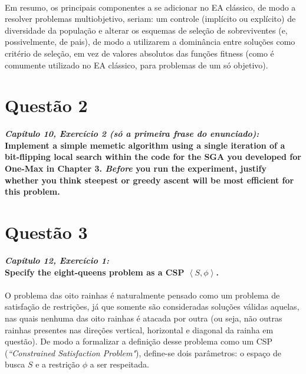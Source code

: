 \documentclass{report}
\begin{document}
\paragraph{} Em resumo, os principais componentes a se adicionar no EA clássico, de modo a resolver problemas multiobjetivo, seriam: um controle (implícito ou explícito) de diversidade da população e alterar os esquemas de seleção de sobreviventes (e, possivelmente, de pais), de modo a utilizarem a dominância entre soluções como critério de seleção, em vez de valores absolutos das funções fitness (como é comumente utilizado no EA clássico, para problemas de um só objetivo).\\

\section*{Questão 2}

\textbf{\textit{Capítulo 10, Exercício 2 (só a primeira frase do enunciado):}}\\

\textbf{Implement a simple memetic algorithm using a single iteration of a bit-flipping local search within the code for the SGA you developed for One-Max in Chapter 3. \textit{Before} you run the experiment, justify whether you think steepest or greedy ascent will be most efficient for this problem.}\\

\paragraph{}

\section*{Questão 3}

\textbf{\textit{Capítulo 12, Exercício 1:}}\\

\textbf{Specify the eight-queens problem as a CSP $\left<S,\phi\right>$.}\\

\paragraph{} O problema das oito rainhas é naturalmente pensado como um problema de satisfação de restrições, já que somente são consideradas soluções válidas aquelas, nas quais nenhuma das oito rainhas é atacada por outra (ou seja, não outras rainhas presentes nas direções vertical, horizontal e diagonal da rainha em questão). De modo a formalizar a definição desse problema como um CSP (\textit{``Constrained Satisfaction Problem"}), define-se dois parâmetros: o espaço de busca $S$ e a restrição $\phi$ a ser respeitada.\\
\end{document}
